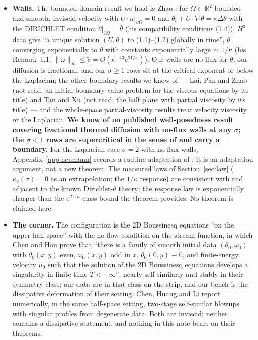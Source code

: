 \documentclass[11pt,a4paper]{article}
\newcommand{\R}{\mathbb{R}}
\newcommand{\nrm}[1]{\lVert #1 \rVert}
\begin{document}
\begin{itemize}[leftmargin=1.5em]
\item \textbf{Walls.} The bounded-domain result we hold is Zhao \cite[Theorem~1.1]{Zhao10}: for $\Omega\subset\R^2$ bounded and smooth, inviscid velocity with $U\cdot n|_{\partial\Omega}=0$ and $\theta_t+U\cdot\nabla\theta=\kappa\Delta\theta$ with the DIRICHLET condition $\theta|_{\partial\Omega}=\bar\theta$ (his compatibility conditions (1.4)), $H^3$ data give ``a unique solution $(U,\theta)$ to (1.1)--(1.2) globally in time'', $\theta$ converging exponentially to $\bar\theta$ with constants exponentially large in $1/\kappa$ (his Remark~1.1: $\nrm\omega_\infty\le\tilde c=O(\kappa^{-43}e^{21/\kappa})$). Our walls are no-flux for $\theta$, our diffusion is fractional, and our $\sigma\ge1$ rows sit at the critical exponent or below the Laplacian; the other boundary results we know of --- Lai, Pan and Zhao \cite{LPZ11} (not read; an initial-boundary-value problem for the viscous equations by its title) and Tan and Xu \cite{TX23} (not read; the half plane with partial viscosity by its title) --- and the whole-space partial-viscosity results \cite{Chae06,HL05} treat velocity viscosity or the Laplacian. \textbf{We know of no published well-posedness result covering fractional thermal diffusion with no-flux walls at any $\sigma$; the $\sigma<1$ rows are supercritical in the sense of \cite{SWXY26} and carry a boundary.} For the Laplacian case $\sigma=2$ with no-flux walls, Appendix~\ref{app:neumann} records a routine adaptation of \cite{Zhao10}; it is an adaptation argument, not a new theorem. The measured laws of Section~\ref{sec:law} ($\kappa_c(\sigma)=0$ as an extrapolation; the $1/\kappa$ response) are consistent with and adjacent to the known Dirichlet-$\theta$ theory; the response law is exponentially sharper than the $e^{21/\kappa}$-class bound the theorem provides. No theorem is claimed here.
\item \textbf{The corner.} The configuration is the 2D Boussinesq equations ``on the upper half space'' with the no-flow condition on the stream function, in which Chen and Hou \cite[Theorem~1]{CH22} prove that ``there is a family of smooth initial data $(\theta_0,\omega_0)$ with $\theta_0(x,y)$ even, $\omega_0(x,y)$ odd in $x$, $\theta_0(0,y)\equiv0$, and finite-energy velocity $u_0$ such that the solution of the 2D Boussinesq equations develops a singularity in finite time $T<+\infty$'', nearly self-similarly and stably in their symmetry class; our data are in that class on the strip, and our bench is the dissipative deformation of their setting. Chen, Huang and Li \cite[\S6]{CHL26} report numerically, in the same half-space setting, two-stage self-similar blowups with singular profiles from degenerate data. Both are inviscid; neither contains a dissipative statement, and nothing in this note bears on their theorems.

\end{itemize}
\end{document}
